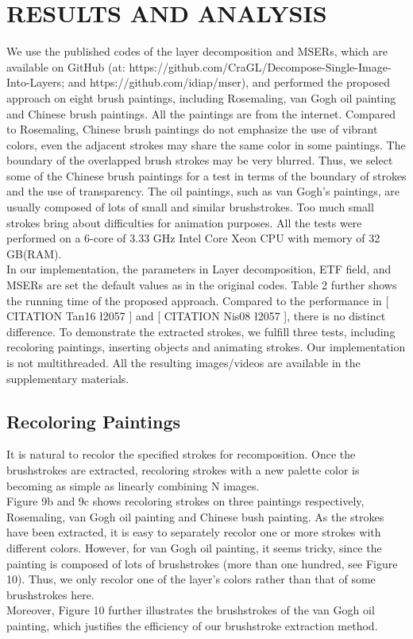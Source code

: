 \section{ RESULTS AND ANALYSIS}
We use the published codes of the layer decomposition and MSERs, which are available on GitHub (at: https://github.com/CraGL/Decompose-Single-Image-Into-Layers; and https://github.com/idiap/mser), and performed the proposed approach on eight brush paintings, including Rosemaling, van Gogh oil painting and Chinese brush paintings. All the paintings are from the internet. Compared to Rosemaling, Chinese brush paintings do not emphasize the use of vibrant colors, even the adjacent strokes may share the same color in some paintings. The boundary of the overlapped brush strokes may be very blurred. Thus, we select some of the Chinese brush paintings for a test in terms of the boundary of strokes and the use of transparency. The oil paintings, such as van Gogh’s paintings, are usually composed of lots of small and similar brushstrokes. Too much small strokes bring about difficulties for animation purposes. All the tests were performed on a 6-core of 3.33 GHz Intel Core Xeon CPU with memory of 32 GB(RAM).\\
In our implementation, the parameters in Layer decomposition, ETF field, and MSERs are set the default values as in the original codes. Table 2 further shows the running time of the proposed approach. Compared to the performance in [ CITATION Tan16 \l 2057 ] and [ CITATION Nis08 \l 2057 ], there is no distinct difference. To demonstrate the extracted strokes, we fulfill three tests, including recoloring paintings, inserting objects and animating strokes. Our implementation is not multithreaded. All the resulting images/videos are available in the supplementary materials.
\subsection{Recoloring Paintings}
It is natural to recolor the specified strokes for recomposition. Once the brushstrokes are extracted, recoloring strokes with a new palette color is becoming as simple as linearly combining N images.\\
Figure 9b and 9c shows recoloring strokes on three paintings respectively, Rosemaling, van Gogh oil painting and Chinese bush painting. As the strokes have been extracted, it is easy to separately recolor one or more strokes with different colors. However, for van Gogh oil painting, it seems tricky, since the painting is composed of lots of brushstrokes (more than one hundred, see Figure 10). Thus, we only recolor one of the layer’s colors rather than that of some brushstrokes here.\\
Moreover, Figure 10 further illustrates the brushstrokes of the van Gogh oil painting, which justifies the efficiency of our brushstroke extraction method.
